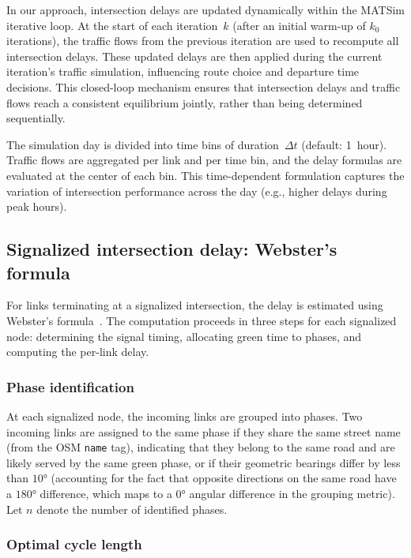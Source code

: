In our approach, intersection delays are updated dynamically within the MATSim iterative loop. At the start of each iteration~$k$ (after an initial warm-up of $k_0$ iterations), the traffic flows from the previous iteration are used to recompute all intersection delays. These updated delays are then applied during the current iteration's traffic simulation, influencing route choice and departure time decisions. This closed-loop mechanism ensures that intersection delays and traffic flows reach a consistent equilibrium jointly, rather than being determined sequentially.

The simulation day is divided into time bins of duration~$\Delta t$ (default: 1~hour). Traffic flows are aggregated per link and per time bin, and the delay formulas are evaluated at the center of each bin. This time-dependent formulation captures the variation of intersection performance across the day (e.g., higher delays during peak hours).

\subsection{Signalized intersection delay: Webster's formula}

For links terminating at a signalized intersection, the delay is estimated using Webster's formula~\cite{Webster1958}. The computation proceeds in three steps for each signalized node: determining the signal timing, allocating green time to phases, and computing the per-link delay.

\subsubsection{Phase identification}

At each signalized node, the incoming links are grouped into phases. Two incoming links are assigned to the same phase if they share the same street name (from the OSM \texttt{name} tag), indicating that they belong to the same road and are likely served by the same green phase, or if their geometric bearings differ by less than $10°$ (accounting for the fact that opposite directions on the same road have a $180°$ difference, which maps to a $0°$ angular difference in the grouping metric). Let $n$ denote the number of identified phases.

\subsubsection{Optimal cycle length}

